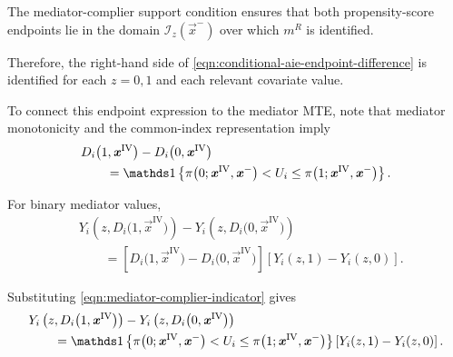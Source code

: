 The mediator-complier support condition ensures that both propensity-score endpoints lie in the domain $\mathcal I_z(\vec x^-)$ over which $m^R$ is identified.

Therefore, the right-hand side of \eqref{eqn:conditional-aie-endpoint-difference} is identified for each $z=0,1$ and each relevant covariate value.

To connect this endpoint expression to the mediator MTE, note that mediator monotonicity and the common-index representation imply
\[
    \begin{aligned}
    &D_i
    \big(
        1,
        \vec x^{\mathrm{IV}}
    \big)
    -
    D_i
    \big(
        0,
        \vec x^{\mathrm{IV}}
    \big)
    \\
    &\qquad=
    \indicator{
        \pi
        \big(
            0;
            \vec x^{\mathrm{IV}},
            \vec x^-
        \big)
        <
        U_i
        \leq
        \pi
        \big(
            1;
            \vec x^{\mathrm{IV}},
            \vec x^-
        \big)
    }.
    \end{aligned}
    \label{eqn:mediator-complier-indicator}
\]

For binary mediator values,
\[
    \begin{aligned}
    &Y_i
    \left(
        z,
        D_i
        \big(
            1,
            \vec x^{\mathrm{IV}}
        \big)
    \right)
    -
    Y_i
    \left(
        z,
        D_i
        \big(
            0,
            \vec x^{\mathrm{IV}}
        \big)
    \right)
    \\
    &\qquad=
    \left[
        D_i
        \big(
            1,
            \vec x^{\mathrm{IV}}
        \big)
        -
        D_i
        \big(
            0,
            \vec x^{\mathrm{IV}}
        \big)
    \right]
    \left[
        Y_i(z,1)-Y_i(z,0)
    \right].
    \end{aligned}
\]

Substituting \eqref{eqn:mediator-complier-indicator} gives
\[
    \begin{aligned}
    &Y_i
    \left(
        z,
        D_i
        \big(
            1,
            \vec x^{\mathrm{IV}}
        \big)
    \right)
    -
    Y_i
    \left(
        z,
        D_i
        \big(
            0,
            \vec x^{\mathrm{IV}}
        \big)
    \right)
    \\
    &\qquad=
    \indicator{
        \pi
        \big(
            0;
            \vec x^{\mathrm{IV}},
            \vec x^-
        \big)
        <
        U_i
        \leq
        \pi
        \big(
            1;
            \vec x^{\mathrm{IV}},
            \vec x^-
        \big)
    }
    \left[
        Y_i(z,1)-Y_i(z,0)
    \right].
    \end{aligned}
\]

